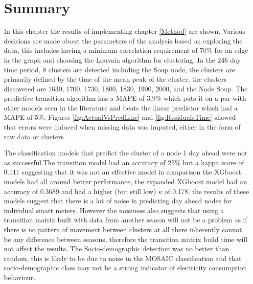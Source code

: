 \section{Summary}

In this chapter the results of implementing chapter \ref{Method} are shown. Various decisions are made about the parameters of the analysis based on exploring the data, this includes having a minimum correlation requirement of 70\% for an edge in the graph and choosing the Louvain algorithm for clustering. In the 246 day time period, 8 clusters are detected including the Soup node, the clusters are primarily defined by the time of the mean peak of the cluster, the clusters discovered are 1630, 1700, 1730, 1800, 1830, 1900, 2000, and the Node Soup. The predictive transition algorithm has a MAPE of 3.9\% which puts it on a par with other models seen in the literature and beats the linear predictor which had a MAPE of 5\%. Figures \ref{fig:ActualVsPredLine} and \ref{fig:ResidualsTime} showed that errors were induced when missing data was imputed, either in the form of raw data or clusters

The classification models that predict the cluster of a node 1 day ahead were not as successful.The transition model had an accuracy of 25\% but a kappa score of 0.111 suggesting that it was not an effective model in comparison the XGboost models had all around better performance, the expanded XGboost model had an accuracy of 0.3689 and had a higher (but still low) $\kappa$ of 0.178, the results of these models suggest that there is a lot of noise in predicting day ahead nodes for individual smart meters. However the noisiness also suggests that using a transition matrix built with data from another season will not be a problem as if there is no pattern of movement between clusters at all there inherently cannot be any difference between seasons, therefore the transition matrix build time will not affect the results. The Socio-demographic detection was no better than random, this is likely to be due to noise in the MOSAIC classification and that socio-demographic class may not be a strong indicator of electricity consumption behaviour.






